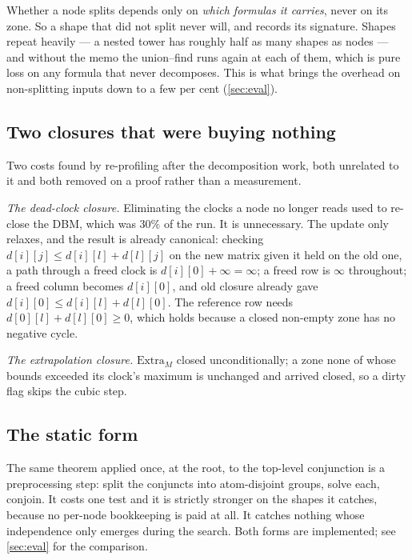 Whether a node splits depends only on \emph{which formulas it carries}, never on
its zone. So a shape that did not split never will, and  records
its signature. Shapes repeat heavily --- a nested tower has roughly half as many
shapes as nodes --- and without the memo the union--find runs again at each of
them, which is pure loss on any formula that never decomposes. This is what
brings the overhead on non-splitting inputs down to a few per cent
(\cref{sec:eval}).

\subsection{Two closures that were buying nothing}

Two costs found by re-profiling after the decomposition work, both unrelated to
it and both removed on a proof rather than a measurement.

\emph{The dead-clock closure.} Eliminating the clocks a node no longer reads
used to re-close the DBM, which was $30\%$ of the run. It is unnecessary. The
update only relaxes, and the result is already canonical: checking
$d[i][j]\le d[i][l]+d[l][j]$ on the new matrix given it held on the old one, a
path through a freed clock is $d[i][0]+\infty=\infty$; a freed row is $\infty$
throughout; a freed column becomes $d[i][0]$, and old closure already gave
$d[i][0]\le d[i][l]+d[l][0]$. The reference row needs
$d[0][l]+d[l][0]\ge 0$, which holds because a closed non-empty zone has no
negative cycle.

\emph{The extrapolation closure.} $\mathrm{Extra}_M$ closed unconditionally; a
zone none of whose bounds exceeded its clock's maximum is unchanged and arrived
closed, so a dirty flag skips the cubic step.

\subsection{The static form}

The same theorem applied once, at the root, to the top-level conjunction is a
preprocessing step: split the conjuncts into atom-disjoint groups, solve each,
conjoin. It costs one test and it is strictly stronger on the shapes it catches,
because no per-node bookkeeping is paid at all. It catches nothing whose
independence only emerges during the search. Both forms are implemented; see
\cref{sec:eval} for the comparison.
